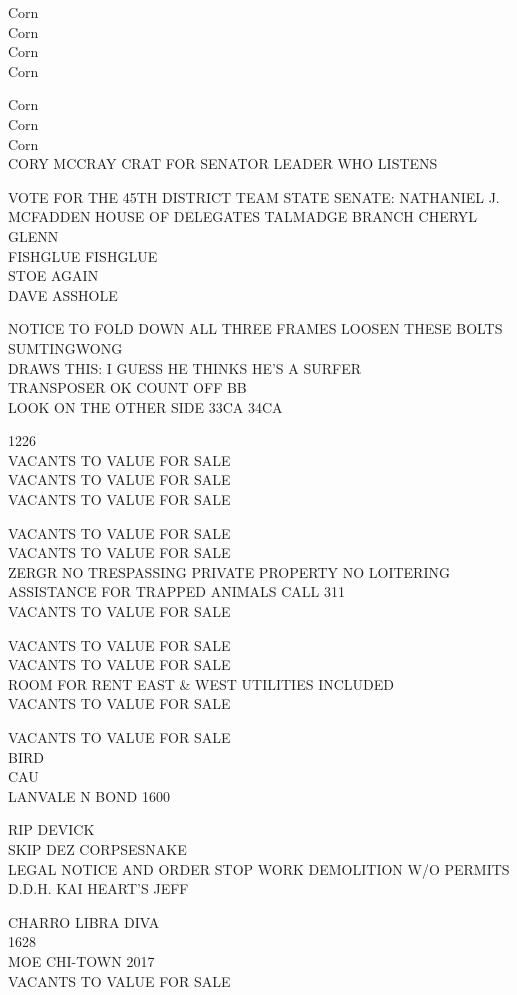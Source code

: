 \documentclass[10pt,letterpaper]{article}
\begin{document}
Corn\\
Corn\\
Corn\\
Corn

Corn\\
Corn\\
Corn\\
CORY MCCRAY CRAT FOR SENATOR LEADER WHO LISTENS

VOTE FOR THE 45TH DISTRICT TEAM STATE SENATE: NATHANIEL J. MCFADDEN HOUSE OF DELEGATES TALMADGE BRANCH CHERYL GLENN\\
FISHGLUE FISHGLUE\\
STOE AGAIN\\
DAVE ASSHOLE

NOTICE TO FOLD DOWN ALL THREE FRAMES LOOSEN THESE BOLTS SUMTINGWONG\\
DRAWS THIS: I GUESS HE THINKS HE'S A SURFER\\
TRANSPOSER OK COUNT OFF BB\\
LOOK ON THE OTHER SIDE 33CA 34CA

1226\\
VACANTS TO VALUE FOR SALE\\
VACANTS TO VALUE FOR SALE\\
VACANTS TO VALUE FOR SALE

VACANTS TO VALUE FOR SALE\\
VACANTS TO VALUE FOR SALE\\
ZERGR NO TRESPASSING PRIVATE PROPERTY NO LOITERING ASSISTANCE FOR TRAPPED ANIMALS CALL 311\\
VACANTS TO VALUE FOR SALE

VACANTS TO VALUE FOR SALE\\
VACANTS TO VALUE FOR SALE\\
ROOM FOR RENT EAST \& WEST UTILITIES INCLUDED\\
VACANTS TO VALUE FOR SALE

VACANTS TO VALUE FOR SALE\\
BIRD\\
CAU\\
LANVALE N BOND 1600

RIP DEVICK\\
SKIP DEZ CORPSESNAKE\\
LEGAL NOTICE AND ORDER STOP WORK DEMOLITION W/O PERMITS\\
D.D.H. KAI HEART'S JEFF

CHARRO LIBRA DIVA\\
1628\\
MOE CHI{-}TOWN 2017\\
VACANTS TO VALUE FOR SALE
\end{document}
